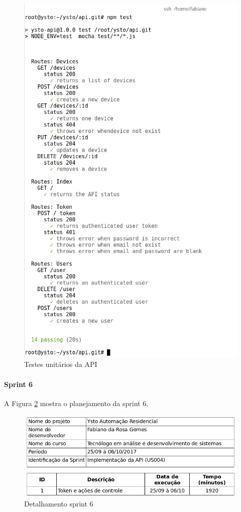 \begin{figure}[H]
\caption{\label{testes} Testes unitários da API}
\includegraphics[scale=0.5]{img/resultado-testes.png}
\end{figure}

\paragraph{Sprint 6} A Figura \ref{sprint-6} mostra o planejamento da sprint 6.

\begin{figure}[H]
\caption{\label{sprint-6} Detalhamento sprint 6}
\includegraphics[scale=0.5]{img/sprint-6.png}
\end{figure}

